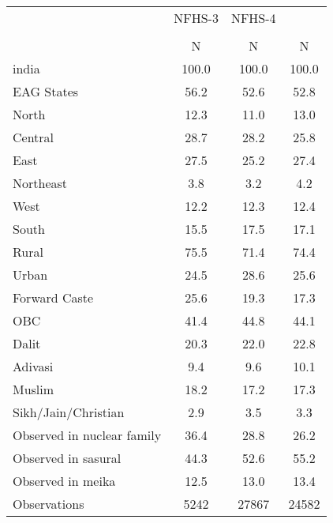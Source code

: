 {
\def\sym#1{\ifmmode^{#1}\else\(^{#1}\)\fi}
\begin{tabular}{l*{3}{c}}
\toprule
                    &      NFHS-3&      NFHS-4&            \\
                    &\multicolumn{1}{c}{}&\multicolumn{1}{c}{}&\multicolumn{1}{c}{}\\
                    &           N&           N&           N\\
\midrule
india               &       100.0&       100.0&       100.0\\
EAG States          &        56.2&        52.6&        52.8\\
North               &        12.3&        11.0&        13.0\\
Central             &        28.7&        28.2&        25.8\\
East                &        27.5&        25.2&        27.4\\
Northeast           &         3.8&         3.2&         4.2\\
West                &        12.2&        12.3&        12.4\\
South               &        15.5&        17.5&        17.1\\
Rural               &        75.5&        71.4&        74.4\\
Urban               &        24.5&        28.6&        25.6\\
Forward Caste       &        25.6&        19.3&        17.3\\
OBC                 &        41.4&        44.8&        44.1\\
Dalit               &        20.3&        22.0&        22.8\\
Adivasi             &         9.4&         9.6&        10.1\\
Muslim              &        18.2&        17.2&        17.3\\
Sikh/Jain/Christian &         2.9&         3.5&         3.3\\
Observed in nuclear family&        36.4&        28.8&        26.2\\
Observed in sasural &        44.3&        52.6&        55.2\\
Observed in meika   &        12.5&        13.0&        13.4\\
\midrule
Observations        &        5242&       27867&       24582\\
\bottomrule
\end{tabular}
}
